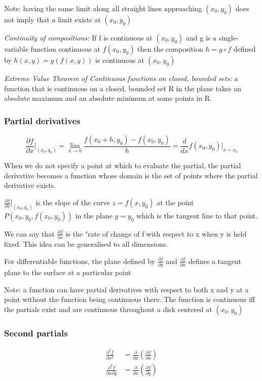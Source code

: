 \documentclass[12pt]{article}
\begin{document}
Note: having the same limit along all straight lines approaching $(x_0, y_0)$ does not imply that a limit exists at $(x_0, y_0)$

\emph{Continuity of compositions:} If f is continuous at $(x_0, y_0)$ and g is a single-variable function continuous at $f(x_0, y_0)$ then the composition $h = g \circ f$ defined by $h(x, y) = g(f(x, y))$ is continuous at $(x_0, y_0)$

\emph{Extreme Value Theorem of Continuous functions on closed, bounded sets:} a function that is continuous on a closed, bounded set R in the plane takes an absolute maximum and an absolute minimum at some points in R. 

\subsubsection{Partial derivatives}
\[\frac{\partial f}{\partial x} \bigg|_{(x_0, y_0)} = \lim_{h \to 0} \frac{f(x_0 + h, y_0) - f(x_0, y_0)}{h} = \frac{d}{dx} f(x_0, y_0)\big|_{x=x_0}\]

When we do not specify a point at which to evaluate the partial, the partial derivative becomes a function whose domain is the set of points where the partial derivative exists.

$\frac{\partial f}{\partial x} \big|_{(x_0, y_0)}$ is the slope of the curve $z = f(x, y_0)$ at the point $P(x_0, y_0, f(x_0, y_0))$ in the plane $y = y_0$ which is the tangent line to that point. 

We can say that $\frac{\partial f}{\partial x}$ is the "rate of change of f with respect to x when y is held fixed. This idea can be generalised to all dimensions. 

For differentiable functions, the plane defined by $\frac{\partial f}{\partial y}$ and $\frac{\partial f}{\partial x}$ defines a tangent plane to the surface at a particular point

Note: a function can have partial derivatives with respect to both x and y at a point without the function being continuous there. The function is continuous iff the partials exist and are continuous throughout a disk centered at $(x_0, y_0)$

\subsubsection{Second partials}
\begin{align*}
    \frac{\partial^2 f}{\partial x^2} &= \frac{\partial}{\partial x} \left(\frac{\partial f}{\partial x}\right)\\
    \frac{\partial^2 f}{\partial x \partial y} &= \frac{\partial}{\partial x} \left(\frac{\partial f}{\partial y}\right)
\end{align*}
\end{document}
